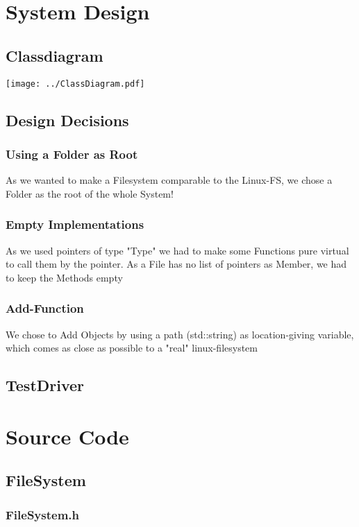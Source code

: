 \section{System Design}
\newpage
\subsection{Classdiagram}
\texttt{[image: ../ClassDiagram.pdf]}

\subsection{Design Decisions}
\subsubsection{Using a Folder as Root}
As we wanted to make a Filesystem comparable to the Linux-FS, we chose a Folder as the root of the whole System! 

\subsubsection{Empty Implementations}
As we used pointers of type "Type" we had to make some Functions pure virtual to call them by the pointer. As a File has no list of pointers as Member, we had to keep the Methods empty

\subsubsection{Add-Function}
We chose to Add Objects by using a path (std::string) as location-giving variable, which comes as close as possible to a "real" linux-filesystem


\subsection{TestDriver}
\newpage

\section{Source Code}

\subsection{FileSystem}
\subsubsection{FileSystem.h}
